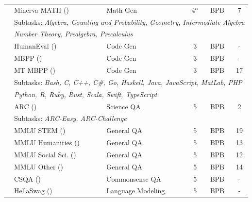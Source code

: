 \documentclass[table]{ai2style/ai2}
\begin{document}
\begin{table}[t]
\begin{scriptsize}
\begin{tabular}{lllccc}
\rowcolor{ai2offwhite} & Minerva MATH (\citeyear{lewkowycz2022solving}) & Math Gen & 4$^\alpha$ & BPB & 7 \\
\rowcolor{ai2offwhite} & \multicolumn{5}{l}{\hspace{6pt}Subtasks: \textit{Algebra, Counting and Probability, Geometry, Intermediate Algebra} } \\
\rowcolor{ai2offwhite}\rowcolor{ai2offwhite} \multirow{-3}{*}{\rotatebox[origin=c]{90}{\textit{Math}}} & \multicolumn{5}{l}{\hspace{6pt}\textit{Number Theory, Prealgebra, Precalculus} } \\
\rowcolor{lightgrey} & HumanEval (\citeyear{chen2021codex}) & Code Gen & 3 & BPB & - \\
\rowcolor{lightgrey} & MBPP (\citeyear{austin2021program}) & Code Gen & 3 & BPB & - \\
\rowcolor{lightgrey} & MT MBPP (\citeyear{cassano2022multipl, olmo2025olmo3}) & Code Gen & 3 & BPB & 17 \\
\rowcolor{lightgrey} & \multicolumn{5}{l}{\hspace{6pt}Subtasks: \textit{Bash, C, C++, C\#, Go, Haskell, Java, JavaScript, MatLab, PHP} } \\
\rowcolor{lightgrey}\multirow{-5}{*}{\rotatebox[origin=c]{90}{\textit{Code}}} & \multicolumn{5}{l}{\hspace{6pt}\textit{Python, R, Ruby, Rust, Scala, Swift, TypeScript} } \\
\rowcolor{ai2offwhite} & ARC (\citeyear{clark2018think}) & Science QA & 5 & BPB & 2 \\
\rowcolor{ai2offwhite} & \multicolumn{5}{l}{\hspace{6pt}Subtasks: \textit{ARC-Easy, ARC-Challenge} } \\
\rowcolor{ai2offwhite} & MMLU STEM (\citeyear{hendryckstest2021}) & General QA & 5 & BPB & 19 \\
\rowcolor{ai2offwhite} & MMLU Humanities (\citeyear{hendryckstest2021}) & General QA & 5 & BPB & 13 \\
\rowcolor{ai2offwhite} & MMLU Social Sci. (\citeyear{hendryckstest2021}) & General QA & 5 & BPB & 12 \\
\rowcolor{ai2offwhite} & MMLU Other (\citeyear{hendryckstest2021}) & General QA & 5 & BPB & 14 \\
\rowcolor{ai2offwhite} & CSQA (\citeyear{talmor-etal-2019-commonsenseqa}) & Commonsense QA & 5 & BPB & - \\
\rowcolor{ai2offwhite} & HellaSwag (\citeyear{zellers-etal-2019-hellaswag}) & Language Modeling & 5 & BPB & - \\

\end{tabular}
\end{scriptsize}
\end{table}
\end{document}
